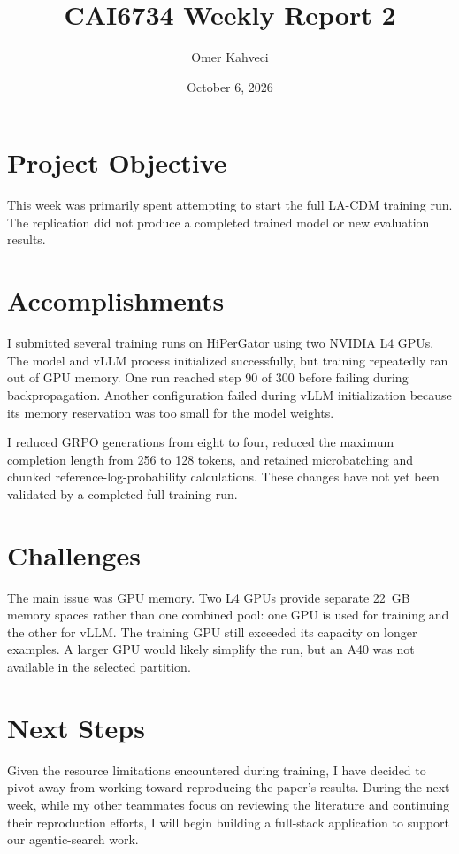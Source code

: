 \documentclass[11pt]{article}
\title{CAI6734 Weekly Report 2}
\author{Omer Kahveci}
\date{October 6, 2026}
\begin{document}
\maketitle

\section{Project Objective}

This week was primarily spent attempting to start the full LA-CDM training
run. The replication did not produce a completed trained model or new
evaluation results.

\section{Accomplishments}

I submitted several training runs on HiPerGator using two NVIDIA L4 GPUs.
The model and vLLM process initialized successfully, but training repeatedly
ran out of GPU memory. One run reached step 90 of 300 before failing during
backpropagation. Another configuration failed during vLLM initialization
because its memory reservation was too small for the model weights.

I reduced GRPO generations from eight to four, reduced the maximum completion
length from 256 to 128 tokens, and retained microbatching and chunked
reference-log-probability calculations. These changes have not yet been
validated by a completed full training run.

\section{Challenges}

The main issue was GPU memory. Two L4 GPUs provide separate 22~GB memory
spaces rather than one combined pool: one GPU is used for training and the
other for vLLM. The training GPU still exceeded its capacity on longer
examples. A larger GPU would likely simplify the run, but an A40 was not
available in the selected partition.

\section{Next Steps}

Given the resource limitations encountered during training, I have decided to
pivot away from working toward reproducing the paper's results. During the
next week, while my other teammates focus on reviewing the literature and
continuing their reproduction efforts, I will begin building a full-stack
application to support our agentic-search work.
\end{document}
